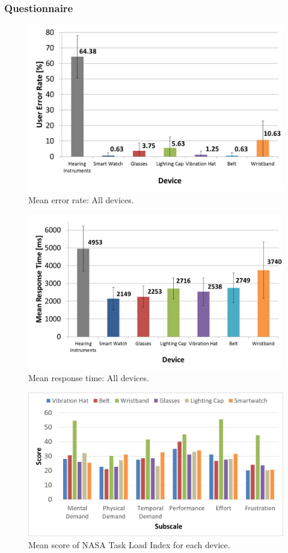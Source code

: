 \documentclass{sigchi}
\begin{document}
\subsubsection{Questionnaire}


\begin{figure}[!t]
\centering
\includegraphics[width=\columnwidth]{All_ER}
\caption{Mean error rate: All devices.}
\label{fig:All_ER}
\end{figure}

\begin{figure}[!t]
\centering
\includegraphics[width=\columnwidth]{All_RT}
\caption{Mean response time: All devices.}
\label{fig:All_RT}
\end{figure}

\begin{figure}[!t]
\centering
\includegraphics[width=\columnwidth]{nasa_tlx}
\caption{Mean score of NASA Task Load Index for each device.}
\label{fig:nasa_tlx}
\end{figure}
\end{document}
